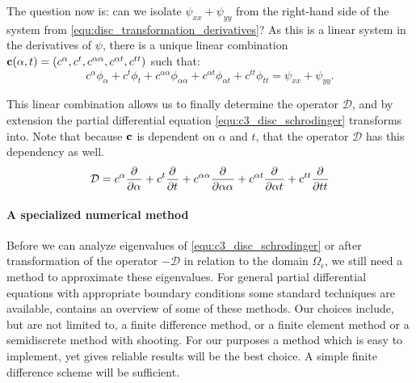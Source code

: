The question now is: can we isolate $\psi_{xx} + \psi_{yy}$ from the right-hand side of the system from \eqref{equ:disc_transformation_derivatives}? As this is a linear system in the derivatives of $\psi$, there is a unique linear combination $\vb{c}(\alpha, t) = (c^\alpha, c^t, c^{\alpha\alpha}, c^{\alpha t}, c^{tt})$ such that:
$$
  c^\alpha \phi_\alpha + c^t\phi_t + c^{\alpha\alpha}\phi_{\alpha\alpha} + c^{\alpha t} \phi_{\alpha t} + c^{tt} \phi_{tt} = \psi_{xx} + \psi_{yy}\text{.}
$$

This linear combination allows us to finally determine the operator $\mathcal{D}$, and by extension the partial differential equation \eqref{equ:c3_disc_schrodinger} transforms into. Note that because $\vb{c}$ is dependent on $\alpha$ and $t$, that the operator $\mathcal{D}$ has this dependency as well.
$$
  \mathcal{D} = c^\alpha {\pdv[]{}{\alpha}} + c^t \pdv[]{}{t} + c^{\alpha\alpha} \pdv[]{}{\alpha\alpha} + c^{\alpha t} \pdv[]{}{\alpha t} + c^{tt} \pdv[]{}{tt}
$$

\paragraph{A specialized numerical method}

Before we can analyze eigenvalues of \eqref{equ:c3_disc_schrodinger} or after transformation of the operator $-\mathcal{D}$ in relation to the domain $\Omega_\epsilon$, we still need a method to approximate these eigenvalues. For general partial differential equations with appropriate boundary conditions some standard techniques are available, \cite[Chapter~11]{heath_scientific_2002} contains an overview of some of these methods. Our choices include, but are not limited to, a finite difference method, or a finite element method or a semidiscrete method with shooting. For our purposes a method which is easy to implement, yet gives reliable results will be the best choice. A simple finite difference scheme will be sufficient.

